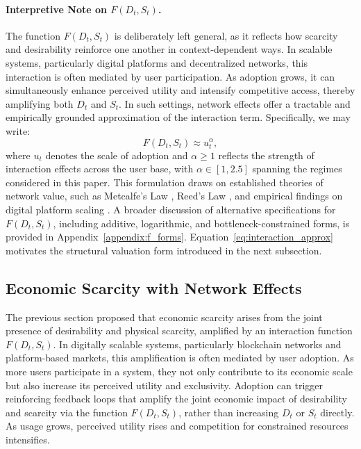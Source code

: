 \documentclass[12pt]{article}
\begin{document}
\paragraph{Interpretive Note on \( F(D_t, S_t) \).} 
The function \( F(D_t, S_t) \) is deliberately left general, as it reflects how scarcity and desirability reinforce one another in context-dependent ways. In scalable systems, particularly digital platforms and decentralized networks, this interaction is often mediated by user participation. As adoption grows, it can simultaneously enhance perceived utility and intensify competitive access, thereby amplifying both \( D_t \) and \( S_t \). In such settings, network effects offer a tractable and empirically grounded approximation of the interaction term. Specifically, we may write:
\begin{equation}
F(D_t, S_t) \approx u_t^{\alpha},
\label{eq:interaction_approx}
\end{equation}
where \( u_t \) denotes the scale of adoption and \( \alpha \geq 1 \) reflects the strength of interaction effects across the user base, with \( \alpha \in [1, 2.5] \) spanning the regimes considered in this paper. This formulation draws on established theories of network value, such as Metcalfe’s Law \citep{metcalfe1995metcalfe}, Reed’s Law \citep{reed2001law}, and empirical findings on digital platform scaling \citep{evans2003two, rochet2006two, cong2019blockchain}. A broader discussion of alternative specifications for \( F(D_t, S_t) \), including additive, logarithmic, and bottleneck-constrained forms, is provided in Appendix~\ref{appendix:f_forms}. Equation~\ref{eq:interaction_approx} motivates the structural valuation form introduced in the next subsection.

\subsection{Economic Scarcity with Network Effects}

The previous section proposed that economic scarcity arises from the joint presence of desirability and physical scarcity, amplified by an interaction function \( F(D_t, S_t) \). In digitally scalable systems, particularly blockchain networks and platform-based markets, this amplification is often mediated by user adoption. As more users participate in a system, they not only contribute to its economic scale but also increase its perceived utility and exclusivity. Adoption can trigger reinforcing feedback loops that amplify the joint economic impact of desirability and scarcity via the function \( F(D_t, S_t) \), rather than increasing \( D_t \) or \( S_t \) directly. As usage grows, perceived utility rises and competition for constrained resources intensifies.
\end{document}
